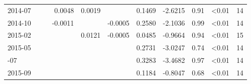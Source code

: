 \begin{table}
\begin{tabular}[t]{lrrrrrrrrlr}
2014-07 &  &  & 0.0048 & 0.0019 &  & 0.1469 & -2.6215 & 0.91 & \textless0.01 & 14\\
2014-10 &  &  & -0.0011 &  & -0.0005 & 0.2580 & -2.1036 & 0.99 & \textless0.01 & 14\\
2015-02 &  &  &  & 0.0121 & -0.0005 & 0.0485 & -0.9664 & 0.94 & \textless0.01 & 15\\
2015-05 &  &  &  &  &  & 0.2731 & -3.0247 & 0.74 & \textless0.01 & 14\\
\addlinespace
2015-07 &  &  &  &  &  & 0.3283 & -3.4682 & 0.97 & \textless0.01 & 14\\
2015-09 &  &  &  &  &  & 0.1184 & -0.8047 & 0.68 & \textless0.01 & 14\\
\bottomrule
\end{tabular}
\end{table}
